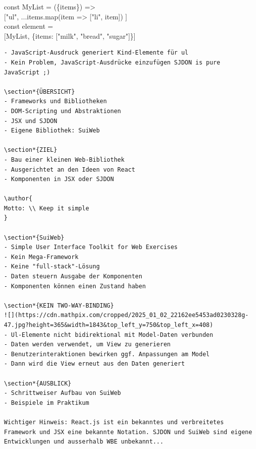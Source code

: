 \documentclass[10pt]{article}
\begin{document}
const MyList = (\{items\}) =>\\[0pt]
["ul", ...items.map(item => ["li", item]) ]\\
const element =\\[0pt]
[MyList, \{items: ["milk", "bread", "sugar"]\}]

\begin{verbatim}
- JavaScript-Ausdruck generiert Kind-Elemente für ul
- Kein Problem, JavaScript-Ausdrücke einzufügen SJDON is pure JavaScript ;)

\section*{ÜBERSICHT}
- Frameworks und Bibliotheken
- DOM-Scripting und Abstraktionen
- JSX und SJDON
- Eigene Bibliothek: SuiWeb

\section*{ZIEL}
- Bau einer kleinen Web-Bibliothek
- Ausgerichtet an den Ideen von React
- Komponenten in JSX oder SJDON

\author{
Motto: \\ Keep it simple
}

\section*{SuiWeb}
- Simple User Interface Toolkit for Web Exercises
- Kein Mega-Framework
- Keine "full-stack"-Lösung
- Daten steuern Ausgabe der Komponenten
- Komponenten können einen Zustand haben

\section*{KEIN TWO-WAY-BINDING}
![](https://cdn.mathpix.com/cropped/2025_01_02_22162ee5453ad0230328g-47.jpg?height=365&width=1843&top_left_y=750&top_left_x=408)
- Ul-Elemente nicht bidirektional mit Model-Daten verbunden
- Daten werden verwendet, um View zu generieren
- Benutzerinteraktionen bewirken ggf. Anpassungen am Model
- Dann wird die View erneut aus den Daten generiert

\section*{AUSBLICK}
- Schrittweiser Aufbau von SuiWeb
- Beispiele im Praktikum

Wichtiger Hinweis: React.js ist ein bekanntes und verbreitetes Framework und JSX eine bekannte Notation. SJDON und SuiWeb sind eigene Entwicklungen und ausserhalb WBE unbekannt...


\end{verbatim}
\end{document}
